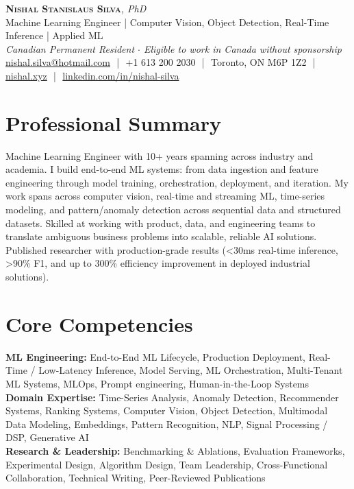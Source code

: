 \documentclass[11pt]{article}
\begin{document}
\pagestyle{empty}
\begin{center}
    {\LARGE \scshape \textbf{Nishal Stanislaus Silva}}{\large \textit{, PhD}}
    \\[1pt]
    {\small Machine Learning Engineer | Computer Vision, Object Detection, Real-Time Inference | Applied ML}
    \\[1pt]
    {\footnotesize\textit{Canadian Permanent Resident $\cdot$ Eligible to work in Canada without sponsorship}}
    \\[1pt]
    {\small \href{mailto:nishal.silva@hotmail.com}{nishal.silva@hotmail.com}
    \,\,|\,\, +1 613 200 2030
    \,\,|\,\, Toronto, ON M6P 1Z2
    \,\,|\,\, \href{https://nishal.xyz}{nishal.xyz}
    \,\,|\,\, \href{https://www.linkedin.com/in/nishal-silva}{linkedin.com/in/nishal-silva}}
\end{center}

\section*{Professional Summary}
Machine Learning Engineer with 10+ years spanning across industry and academia. I build end-to-end ML systems: from data ingestion and feature engineering through model training, orchestration, deployment, and iteration. My work spans across computer vision, real-time and streaming ML, time-series modeling, and pattern/anomaly detection across sequential data and structured datasets. Skilled at working with product, data, and engineering teams to translate ambiguous business problems into scalable, reliable AI solutions. Published researcher with production-grade results (<30ms real-time inference, >90\% F1, and up to 300\% efficiency improvement in deployed industrial solutions).

\section*{Core Competencies}
\textbf{ML Engineering:} End-to-End ML Lifecycle, Production Deployment, Real-Time / Low-Latency Inference, Model Serving, ML Orchestration, Multi-Tenant ML Systems, MLOps, Prompt engineering, Human-in-the-Loop Systems\\
\textbf{Domain Expertise:} Time-Series Analysis, Anomaly Detection, Recommender Systems, Ranking Systems, Computer Vision, Object Detection, Multimodal Data Modeling, Embeddings, Pattern Recognition, NLP, Signal Processing / DSP, Generative AI\\
\textbf{Research \& Leadership:} Benchmarking \& Ablations, Evaluation Frameworks, Experimental Design, Algorithm Design, Team Leadership, Cross-Functional Collaboration, Technical Writing, Peer-Reviewed Publications
\end{document}
